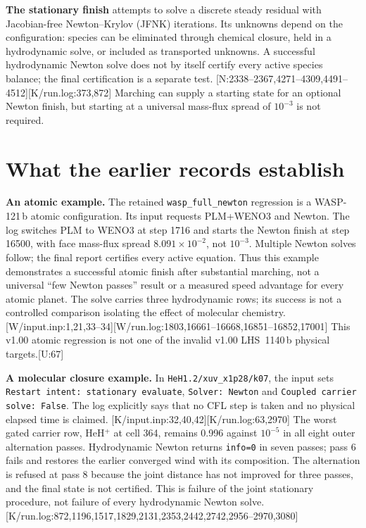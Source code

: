 \documentclass[english,a4paper]{my_memo}
\newcommand{\ev}[2]{\textnormal{\small[#1:#2]}}
\begin{document}
\textbf{The stationary finish} attempts to solve a discrete steady residual
with Jacobian-free Newton--Krylov (JFNK) iterations. Its unknowns depend on the
configuration: species can be eliminated through chemical closure, held in a
hydrodynamic solve, or included as transported unknowns. A successful
hydrodynamic Newton solve does not by itself certify every active species
balance; the final certification is a separate test.
\ev{N}{2338--2367,4271--4309,4491--4512}\ev{K/run.log}{373,872}
Marching can supply a starting state for an optional Newton finish, but
starting at a universal mass-flux spread of $10^{-3}$ is not required.

\section{What the earlier records establish}

\textbf{An atomic example.} The retained \texttt{wasp\_full\_newton}
regression is a WASP-121\,b atomic configuration. Its input requests
PLM+WENO3 and Newton. The log switches PLM to WENO3 at step 1716 and starts
the Newton finish at step 16500, with face mass-flux spread
$8.091\times10^{-2}$, not $10^{-3}$. Multiple Newton solves follow; the final
report certifies every active equation. Thus this example demonstrates a
successful atomic finish after substantial marching, not a universal
``few Newton passes'' result or a measured speed advantage for every atomic
planet. The solve carries three hydrodynamic rows; its success is not a
controlled comparison isolating the effect of molecular chemistry.
\ev{W/input.inp}{1,21,33--34}\ev{W/run.log}{1803,16661--16668,16851--16852,17001}
This v1.00 atomic regression is not one of the invalid v1.00 LHS~1140\,b
physical targets.\ev{U}{67}

\textbf{A molecular closure example.} In
\texttt{HeH1.2/xuv\_x1p28/k07}, the input sets
\texttt{Restart intent: stationary evaluate}, \texttt{Solver: Newton} and
\texttt{Coupled carrier solve: False}. The log explicitly says that no CFL
step is taken and no physical elapsed time is claimed.
\ev{K/input.inp}{32,40,42}\ev{K/run.log}{63,2970}
The worst gated carrier row, HeH$^+$ at cell 364, remains 0.996 against
$10^{-5}$ in all eight outer alternation passes. Hydrodynamic Newton returns
\texttt{info=0} in seven passes; pass 6 fails and restores the earlier
converged wind with its composition. The alternation is refused at pass 8
because the joint distance has not improved for three passes, and the final
state is not certified. This is failure of the joint stationary procedure,
not failure of every hydrodynamic Newton solve.
\ev{K/run.log}{872,1196,1517,1829,2131,2353,2442,2742,2956--2970,3080}
\end{document}
